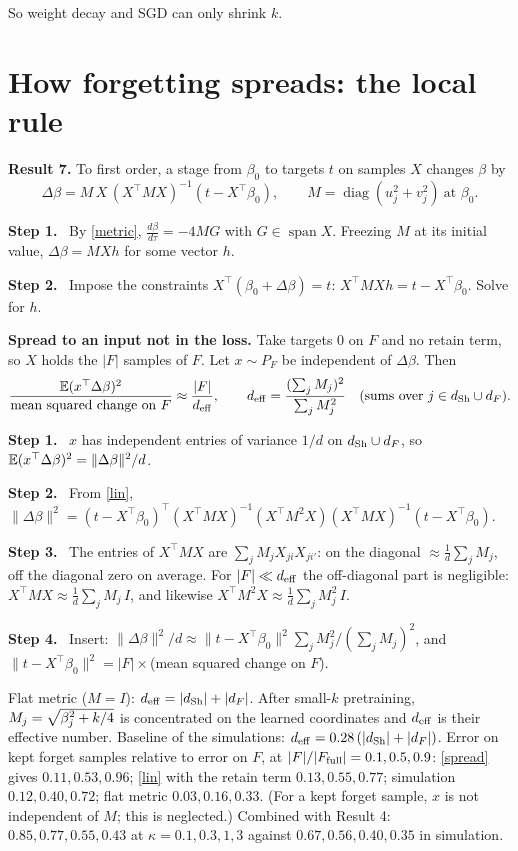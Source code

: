 \documentclass[10pt]{article}
\newcommand{\step}[1]{\par\smallskip\textbf{Step #1.}\ }
\begin{document}
So weight decay and SGD can only shrink $k$.

\section{How forgetting spreads: the local rule}
\textbf{Result 7.} To first order, a stage from $\beta_0$ to targets $t$ on samples $X$ changes $\beta$ by
\begin{equation}\label{lin}
\Delta\beta=M\,X\,(X^\top MX)^{-1}(t-X^\top\beta_0),\qquad M=\operatorname{diag}(u_j^2+v_j^2)\ \text{at }\beta_0 .
\end{equation}
\step1 By \eqref{metric}, $\frac{d\beta}{d\tau}=-4MG$ with $G\in\operatorname{span}X$. Freezing $M$ at its initial value, $\Delta\beta=MXh$ for some vector $h$.
\step2 Impose the constraints $X^\top(\beta_0+\Delta\beta)=t$: $X^\top MXh=t-X^\top\beta_0$. Solve for $h$.

\textbf{Spread to an input not in the loss.} Take targets $0$ on $F$ and no retain term, so $X$ holds the $|F|$ samples of $F$. Let $x\sim P_F$ be independent of $\Delta\beta$. Then
\begin{equation}\label{spread}
\frac{\mathbb E(x^\top\Delta\beta)^2}{\text{mean squared change on }F}\approx\frac{|F|}{d_{\rm eff}},\qquad d_{\rm eff}=\frac{(\sum_jM_j)^2}{\sum_jM_j^2}\quad\text{(sums over }j\in d_{\mathrm{Sh}}\cup d_F).
\end{equation}
\step1 $x$ has independent entries of variance $1/d$ on $d_{\mathrm{Sh}}\cup d_F$, so $\mathbb E(x^\top\Delta\beta)^2=\|\Delta\beta\|^2/d$.
\step2 From \eqref{lin}, $\|\Delta\beta\|^2=(t-X^\top\beta_0)^\top(X^\top MX)^{-1}(X^\top M^2X)(X^\top MX)^{-1}(t-X^\top\beta_0)$.
\step3 The entries of $X^\top MX$ are $\sum_jM_jX_{ji}X_{ji'}$: on the diagonal $\approx\frac1d\sum_jM_j$, off the diagonal zero on average. For $|F|\ll d_{\rm eff}$ the off-diagonal part is negligible: $X^\top MX\approx\frac1d\sum_jM_j\,I$, and likewise $X^\top M^2X\approx\frac1d\sum_jM_j^2\,I$.
\step4 Insert: $\|\Delta\beta\|^2/d\approx\|t-X^\top\beta_0\|^2\sum_jM_j^2/(\sum_jM_j)^2$, and $\|t-X^\top\beta_0\|^2=|F|\times$(mean squared change on $F$).

Flat metric ($M=I$): $d_{\rm eff}=|d_{\mathrm{Sh}}|+|d_F|$. After small-$k$ pretraining, $M_j=\sqrt{\smash[b]{\beta_j^2}+k/4}$ is concentrated on the learned coordinates and $d_{\rm eff}$ is their effective number. Baseline of the simulations: $d_{\rm eff}=0.28\,(|d_{\mathrm{Sh}}|+|d_F|)$. Error on kept forget samples relative to error on $F$, at $|F|/|F_{\mathrm{full}}|=0.1,0.5,0.9$: \eqref{spread} gives $0.11,0.53,0.96$; \eqref{lin} with the retain term $0.13,0.55,0.77$; simulation $0.12,0.40,0.72$; flat metric $0.03,0.16,0.33$. (For a kept forget sample, $x$ is not independent of $M$; this is neglected.) Combined with Result 4: $0.85,0.77,0.55,0.43$ at $\kappa=0.1,0.3,1,3$ against $0.67,0.56,0.40,0.35$ in simulation.
\end{document}
